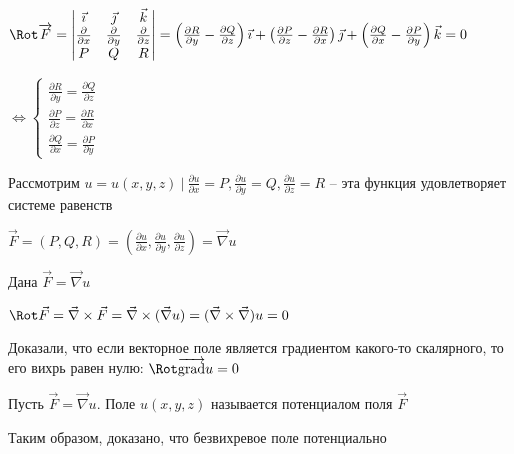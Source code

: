 \documentclass[12pt]{article}
\begin{document}
    \begin{MyProof}
        \fbox{\Longrightarrow}

        $\Rot \overrightarrow{F} =
        \begin{vmatrix}
            \vec\imath & \vec\jmath & \vec k \\
            \frac{\partial}{\partial x} & \frac{\partial}{\partial y} & \frac{\partial}{\partial z} \\
            P & Q & R
        \end{vmatrix} = \left(\frac{\partial R}{\partial y} - \frac{\partial Q}{\partial z}\right)\vec\imath + \left(\frac{\partial P}{\partial z} - \frac{\partial R}{\partial x}\right)\vec\jmath + \left(\frac{\partial Q}{\partial x} - \frac{\partial P}{\partial y}\right)\vec{k} = 0$

        $\Longleftrightarrow
        \begin{cases}
            \frac{\partial R}{\partial y} = \frac{\partial Q}{\partial z} \\
            \frac{\partial P}{\partial z} = \frac{\partial R}{\partial x} \\
            \frac{\partial Q}{\partial x} = \frac{\partial P}{\partial y}
        \end{cases}$

        Рассмотрим $u = u(x, y, z) \ | \ \frac{\partial u}{\partial x} = P, \frac{\partial u}{\partial y} = Q, \frac{\partial u}{\partial z} = R$ -- эта функция удовлетворяет системе равенств

        $\vec{F} = (P, Q, R) = \left(\frac{\partial u}{\partial x}, \frac{\partial u}{\partial y}, \frac{\partial u}{\partial z}\right) = \vec\nabla u$

        \fbox{\Longleftarrow} Дана $\vec{F} = \vec\nabla u$

        $\Rot \vec{F} = \vec\nabla \times \vec{F} = \vec\nabla \times (\vec\nabla u) = (\vec\nabla \times \vec\nabla) u = 0$

    \end{MyProof}

    \Nota Доказали, что если векторное поле является градиентом какого-то скалярного, то его вихрь равен нулю: $\Rot \overrightarrow{\operatorname{grad}} u = 0$

    \Def Пусть $\vec{F} = \vec\nabla u$. Поле $u(x, y, z)$ называется потенциалом поля $\vec{F}$

    Таким образом, доказано, что безвихревое поле потенциально

    \hypertarget{solenoidalfieldproperty}{}
\end{document}
